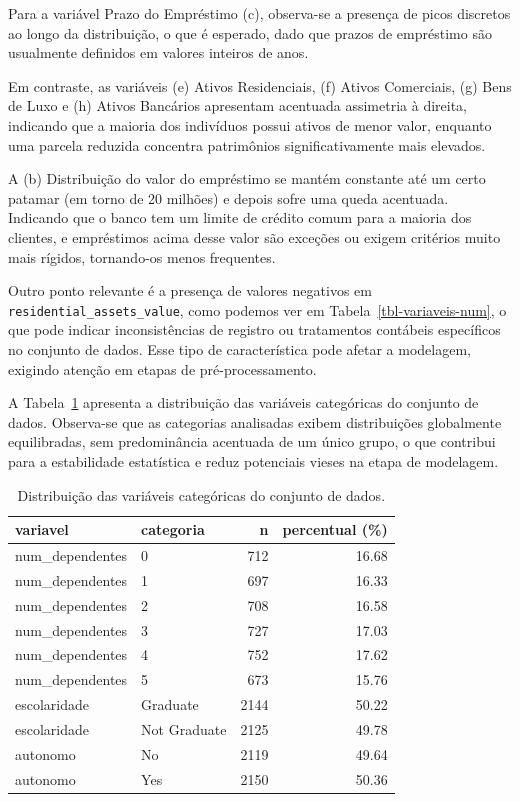 \documentclass[
  brazilian,
  12pt,
  letterpaper,
  DIV=11,
  numbers=noendperiod]{scrartcl}
\begin{document}
Para a variável Prazo do Empréstimo (c), observa-se a presença de picos
discretos ao longo da distribuição, o que é esperado, dado que prazos de
empréstimo são usualmente definidos em valores inteiros de anos.

Em contraste, as variáveis (e) Ativos Residenciais, (f) Ativos
Comerciais, (g) Bens de Luxo e (h) Ativos Bancários apresentam acentuada
assimetria à direita, indicando que a maioria dos indivíduos possui
ativos de menor valor, enquanto uma parcela reduzida concentra
patrimônios significativamente mais elevados.

A (b) Distribuição do valor do empréstimo se mantém constante até um
certo patamar (em torno de 20 milhões) e depois sofre uma queda
acentuada. Indicando que o banco tem um limite de crédito comum para a
maioria dos clientes, e empréstimos acima desse valor são exceções ou
exigem critérios muito mais rígidos, tornando-os menos frequentes.

Outro ponto relevante é a presença de valores negativos em
\texttt{residential\_assets\_value}, como podemos ver em
Tabela~\ref{tbl-variaveis-num}, o que pode indicar inconsistências de
registro ou tratamentos contábeis específicos no conjunto de dados. Esse
tipo de característica pode afetar a modelagem, exigindo atenção em
etapas de pré-processamento.

A Tabela~\ref{tbl-categoricas} apresenta a distribuição das variáveis
categóricas do conjunto de dados. Observa-se que as categorias
analisadas exibem distribuições globalmente equilibradas, sem
predominância acentuada de um único grupo, o que contribui para a
estabilidade estatística e reduz potenciais vieses na etapa de
modelagem.

{

\begin{longtable}[]{@{}llrr@{}}

\caption{\label{tbl-categoricas}Distribuição das variáveis categóricas
do conjunto de dados.}

\tabularnewline

\toprule\noalign{}
variavel & categoria & n & percentual (\%) \\
\midrule\noalign{}
\endhead
\bottomrule\noalign{}
\endlastfoot
num\_dependentes & 0 & 712 & 16.68 \\
num\_dependentes & 1 & 697 & 16.33 \\
num\_dependentes & 2 & 708 & 16.58 \\
num\_dependentes & 3 & 727 & 17.03 \\
num\_dependentes & 4 & 752 & 17.62 \\
num\_dependentes & 5 & 673 & 15.76 \\
escolaridade & Graduate & 2144 & 50.22 \\
escolaridade & Not Graduate & 2125 & 49.78 \\
autonomo & No & 2119 & 49.64 \\
autonomo & Yes & 2150 & 50.36 \\

\end{longtable}

}
\end{document}
